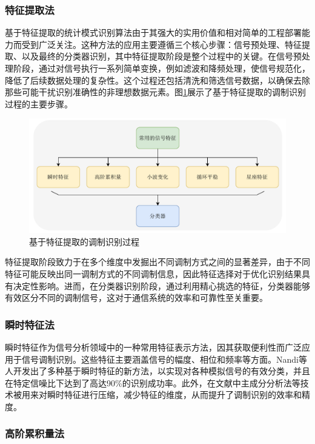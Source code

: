 \subsubsection{特征提取法}

基于特征提取的统计模式识别算法由于其强大的实用价值和相对简单的工程部署能力而受到广泛关注。这种方法的应用主要遵循三个核心步骤：信号预处理、特征提取、以及最终的分类器识别，其中特征提取阶段是整个过程中的关键。在信号预处理阶段，通过对信号执行一系列简单变换，例如滤波和降频处理，使信号规范化，降低了后续数据处理的复杂性。这个过程还包括清洗和筛选信号数据，以确保去除那些可能干扰识别准确性的非理想数据元素。图\ref{fig:feature_based}展示了基于特征提取的调制识别过程的主要步骤。

\begin{figure}
    \centering
    \includegraphics[width=\textwidth]{Image/feature.pdf}
    \caption{基于特征提取的调制识别过程}
    \label{fig:feature_based}
\end{figure}

特征提取阶段致力于在多个维度中发掘出不同调制方式之间的显著差异，由于不同特征可能反映出同一调制方式的不同调制信息，因此特征选择对于优化识别结果具有决定性影响。进而，在分类器识别阶段，通过利用精心挑选的特征，分类器能够有效区分不同的调制信号，这对于通信系统的效率和可靠性至关重要。

\subsubsection{瞬时特征法}
瞬时特征作为信号分析领域中的一种常用特征表示方法，因其获取便利性而广泛应用于信号调制识别。这些特征主要涵盖信号的幅度、相位和频率等方面。Nandi等人\cite{nandi1995automatic}开发出了多种基于瞬时特征的新方法，以实现对各种模拟信号的有效分类，并且在特定信噪比下达到了高达90\%的识别成功率。此外，在文献\cite{陈怀新2004基于统计特征主分量的信号调制识别}中主成分分析法等技术被用来对瞬时特征进行压缩，减少特征的维度，从而提升了调制识别的效率和精度。
\subsubsection{高阶累积量法}

